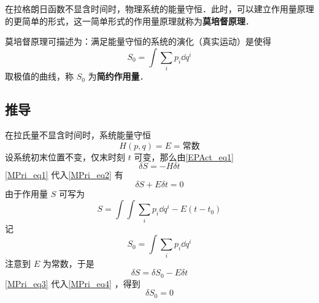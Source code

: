 在拉格朗日函数不显含时间时，物理系统的能量守恒．此时，可以建立作用量原理的更简单的形式，这一简单形式的作用量原理就称为\textbf{莫培督原理}．

莫培督原理可描述为：满足能量守恒的系统的演化（真实运动）是使得
\begin{equation}
S_0=\int\sum_i p_i\dd q^i
\end{equation}
取极值的曲线，称 $S_0$ 为\textbf{简约作用量}．
\subsection{推导}
在拉氏量不显含时间时，系统能量守恒
\begin{equation}\label{MPri_eq1}
H(p,q)=E=\text{常数}
\end{equation}
设系统初末位置不变，仅末时刻 $t$ 可变，那么由\autoref{EPAct_eq1}~
\begin{equation}\label{MPri_eq2}
\delta S=-H\delta t
\end{equation}
\autoref{MPri_eq1} 代入\autoref{MPri_eq2} 有
\begin{equation}\label{MPri_eq4}
\delta S+E\delta t=0
\end{equation}
由于作用量 $S$ 可写为
\begin{equation}
S=\int \int\sum_i p_i\dd q^i-E(t-t_0)
\end{equation}
记
\begin{equation}
S_0=\int\sum_i p_i\dd q^i
\end{equation}
注意到 $E$ 为常数，于是
\begin{equation}\label{MPri_eq3}
\delta S=\delta S_0-E\delta t
\end{equation}
\autoref{MPri_eq3} 代入\autoref{MPri_eq4} ，得到
\begin{equation}
\delta S_0=0
\end{equation}
